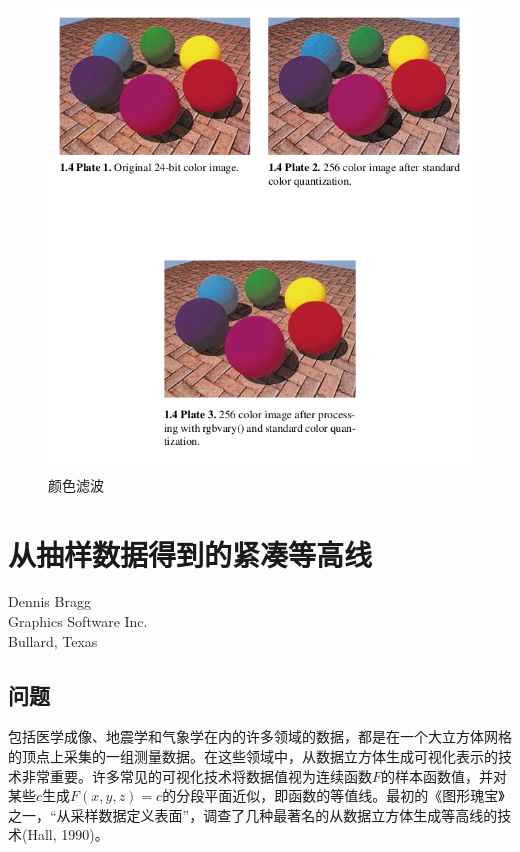 \begin{CJK}{UTF8}{gbsn}
\begin{figure}[htbp]%
  \centering
  \includegraphics[totalheight=5in]{./fig/1.4.png}
  \caption{颜色滤波} 
  \label{fig:1.4}
\end{figure}

\newpage
\section{从抽样数据得到的紧凑等高线}
\begin{center}
\small{
Dennis Bragg\\
Graphics Software Inc.\\
Bullard, Texas}
\end{center}


\subsection*{问题}
包括医学成像、地震学和气象学在内的许多领域的数据，都是在一个大立方体网格的顶点上采集的一组测量数据。在这些领域中，从数据立方体生成可视化表示的技术非常重要。许多常见的可视化技术将数据值视为连续函数$F$的样本函数值，并对某些$c$生成$F(x, y, z) = c$的分段平面近似，即函数的等值线。最初的《图形瑰宝》之一，“从采样数据定义表面”，调查了几种最著名的从数据立方体生成等高线的技术(Hall, 1990)。


\end{CJK}

